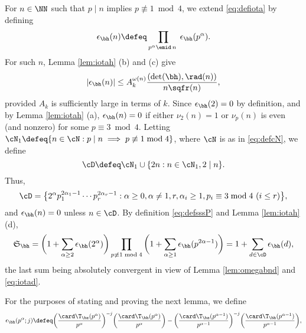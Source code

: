 \documentclass[12pt, reqno, twoside, letterpaper]{amsart}
\begin{document}
For $n \in \NN$ such that $p \mid n$ implies 
$p \not\equiv 1 \bmod 4$, we extend \eqref{eq:defiota} by defining 
\[
 \epsilon_{\bh}(n)
  \defeq 
   \prod_{p^{\alpha} \emid \, n \,\,} \epsilon_{\bh}(p^{\alpha}).
\]
%
%
For such $n$, Lemma \ref{lem:iotah} (b) and (c) give
\begin{equation}
 \label{eq:iotad}
  |\epsilon_{\bh}(n)| 
   \le 
    A_k^{\omega(n)}\frac{(\det(\bh),\rad(n))}{n\sqfr(n)},   
\end{equation}
provided $A_k$ is sufficiently large in terms of $k$.
%
Since $\epsilon_{\bh}(2) = 0$ by definition, and by 
Lemma \ref{lem:iotah} (a), $\epsilon_{\bh}(n) = 0$ if either 
$\nu_2(n) = 1$ or $\nu_p(n)$ is even (and nonzero) for some 
$p \equiv 3 \bmod 4$.
%
Letting 
$
 \cN_1
  \defeq 
   \{n \in \cN : p \mid n \implies p \not\equiv 1 \bmod 4\}
$, 
where $\cN$ is as in \eqref{eq:defcN}, we define 
\begin{equation}
 \label{eq:defcD}
  \cD \defeq \cN_1 \cup \{2n : n \in \cN_1, 2 \mid n\}. 
\end{equation}
%
Thus, 
\[
  \cD 
   =
    \big\{2^{\alpha}p_1^{2\alpha_1 - 1}\cdots p_r^{2\alpha_r - 1} : \alpha \ge 0, \alpha \ne 1, r,\alpha_i \ge 1, p_i \equiv 3 \bmod 4 \text{ ($i \le r$)}\big\},
\]
and $\epsilon_{\bh}(n) = 0$ unless $n \in \cD$.
%
By definition \eqref{eq:defsssP} and Lemma \ref{lem:iotah} (d), 
\begin{equation}
 \label{eq:ssassum}
 \mathfrak{S}_{\bh}
  =
    \bigg(1 + \sum_{\alpha \ge 2} \epsilon_{\bh}(2^{\alpha})\bigg)
     \prod_{p \not\equiv 1 \bmod 4}
      \bigg(1 + \sum_{\alpha \ge 1} \epsilon_{\bh}(p^{2\alpha - 1})\bigg)
   =
        1 + \sum_{d \in \cD} \epsilon_{\bh}(d),
\end{equation}
the last sum being absolutely convergent in view of 
Lemma \ref{lem:omegabnd} and \eqref{eq:iotad}.

For the purposes of stating and proving the next lemma, we define 
{\small 
\[
 \epsilon_{\bh}(p^{\alpha};j)
  \defeq 
   \bigg(\frac{\card \T_{\bz}(p^{\alpha})}{p^{\alpha}}\bigg)^{-j}
    \bigg(\frac{\card \T_{\bh}(p^{\alpha})}{p^{\alpha}}\bigg)
  -
     \bigg(\frac{\card \T_{\bz}(p^{\alpha - 1})}{p^{\alpha - 1}}\bigg)^{-j}
      \bigg(\frac{\card \T_{\bh}(p^{\alpha - 1})}{p^{\alpha - 1}}\bigg), 
\]
}
\end{document}
